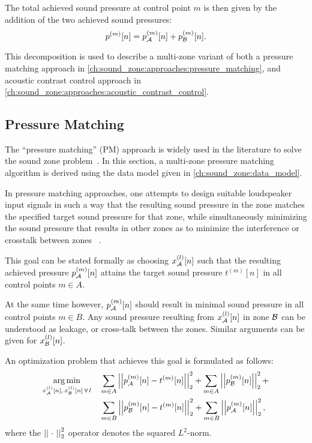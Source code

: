 The total achieved sound pressure at control point $m$ is then given by the addition of the two achieved sound pressures:
\begin{equation}
    p^{(m)}[n] = p_{\mathcal{A}}^{(m)}[n] + p_{\mathcal{B}}^{(m)}[n].
\end{equation}

This decomposition is used to describe a multi-zone variant of both a pressure matching approach 
in \autoref{ch:sound_zone:approaches:pressure_matching},
and acoustic contrast control approach in \autoref{ch:sound_zone:approaches:acoustic_contrast_control}.

\subsection{Pressure Matching}
\label{ch:sound_zone:approaches:pressure_matching}
The ``pressure matching'' (PM) approach is widely used in the literature to 
solve the sound zone problem~\cite{betlehem2015personal, moller2016sound}.
In this section, a multi-zone pressure matching algorithm is derived using the data model 
given in \autoref{ch:sound_zone:data_model}.

In pressure matching approaches, one attempts to design suitable loudspeaker input 
signals in such a way that the resulting sound pressure in the zone 
matches the specified target sound pressure for that zone, 
while simultaneously minimizing the sound pressure that results in other zones as 
to minimize the interference or crosstalk between zones
~\cite{betlehem2015personal, olik2013comparative}.

This goal can be stated formally as choosing $x_{\mathcal{A}}^{(l)}[n]$ such that the resulting achieved pressure 
$p_{\mathcal{A}}^{(m)}[n]$ attains the target sound pressure $t^{(m)}[n]$ in all control points $m \in A$.   

At the same time however, $p_{\mathcal{A}}^{(m)}[n]$ should result in minimal sound pressure in all control points $m \in B$.
Any sound pressure resulting from $x_{\mathcal{A}}^{(l)}[n]$ in zone $\mathcal{B}$ can be 
understood as leakage, or cross-talk between the zones. 
Similar arguments can be given for $x_{\mathcal{B}}^{(l)}[n]$.

An optimization problem that achieves this goal is formulated as follows:
\begin{align}
    \begin{aligned}
        \argmin{x_\za^{(l)}[n],\,x_\zb^{(l)}[n]\,\forall\,l}{
           &\sum_{m\in A} \norm[2][2]{p_\za^{(m)}[n] - t^{(m)}[n]} +
            \sum_{m\in A} \norm[2][2]{p_\zb^{(m)}[n]} + \\
           &\sum_{m\in B} \norm[2][2]{p_\zb^{(m)}[n] - t^{(m)}[n]} + 
            \sum_{m\in B} \norm[2][2]{p_\za^{(m)}[n]}
        },
    \end{aligned}
\end{align}
where the $\norm[2][2]{\,\,\cdot\,\,}$ operator denotes the squared $L^2$-norm.

